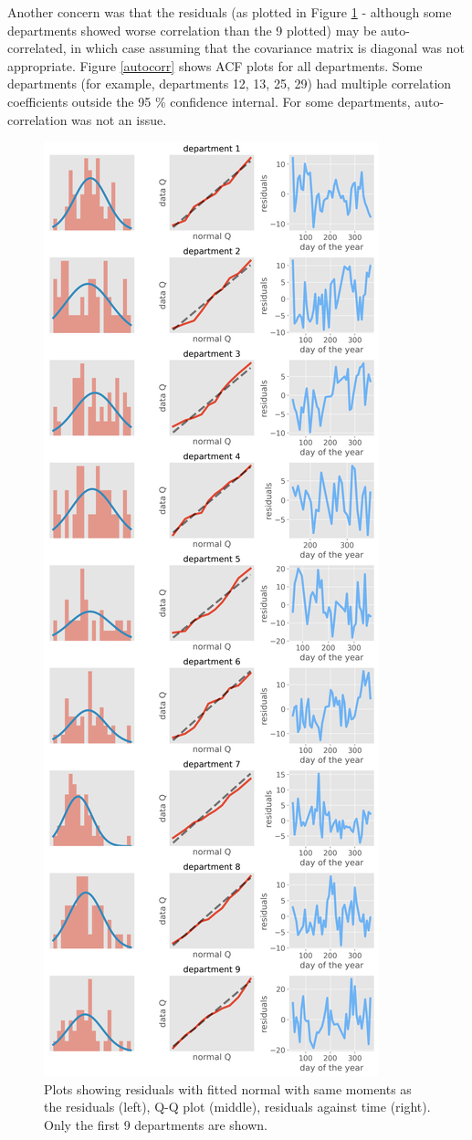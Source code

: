 \documentclass[paper=a4, fontsize=11pt]{scrartcl}
\begin{document}
Another concern was that the residuals (as plotted in Figure \ref{normal} - although some departments showed worse correlation than the 9 plotted) may be auto-correlated, in which case assuming that the covariance matrix is diagonal was not appropriate. Figure \ref{autocorr} shows ACF plots for all departments. Some departments (for example, departments 12, 13, 25, 29) had multiple correlation coefficients outside the 95 \% confidence internal. For some departments, auto-correlation was not an issue.
    
    
\begin{figure}[!htb]\label{normal}
\centering
\includegraphics[width=.5\textwidth]{normal_approx_1.png}
\caption{Plots showing residuals with fitted normal with same moments as the residuals (left), Q-Q plot (middle), residuals against time (right). Only the first 9 departments are shown.}
\end{figure}
\end{document}
